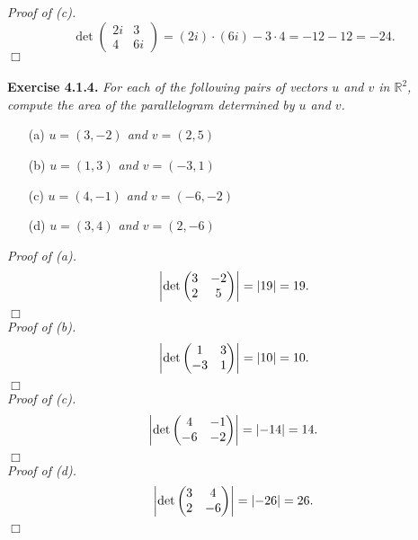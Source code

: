 \documentclass{article}
\begin{document}
\emph{Proof of (c).}
$$\det\begin{pmatrix}
2i & 3 \\
4 & 6i
\end{pmatrix}
= (2i) \cdot (6i) - 3 \cdot 4 = -12 - 12 = -24.$$
$\Box$ \\\\






\textbf{Exercise 4.1.4.}
\emph{For each of the following pairs of vectors $u$ and $v$ in $\mathbb{R}^2$,
compute the area of the parallelogram determined by $u$ and $v$.}
\begin{enumerate}
\item[(a)]
\emph{$u = (3,-2)$ and $v=(2,5)$}
\item[(b)]
\emph{$u = (1,3)$ and $v=(-3,1)$}
\item[(c)]
\emph{$u = (4,-1)$ and $v=(-6,-2)$}
\item[(d)]
\emph{$u = (3,4)$ and $v=(2,-6)$} \\
\end{enumerate}

\emph{Proof of (a).}
$$\abs{\det\begin{pmatrix} 3 & -2 \\ 2 & 5 \end{pmatrix}}
= \abs{19} = 19.$$
$\Box$ \\

\emph{Proof of (b).}
$$\abs{\det\begin{pmatrix} 1 & 3 \\ -3 & 1 \end{pmatrix}}
= \abs{10} = 10.$$
$\Box$ \\

\emph{Proof of (c).}
$$\abs{\det\begin{pmatrix} 4 & -1 \\ -6 & -2 \end{pmatrix}}
= \abs{-14} = 14.$$
$\Box$ \\

\emph{Proof of (d).}
$$\abs{\det\begin{pmatrix} 3 & 4 \\ 2 & -6 \end{pmatrix}}
= \abs{-26} = 26.$$
$\Box$ \\\\
\end{document}
